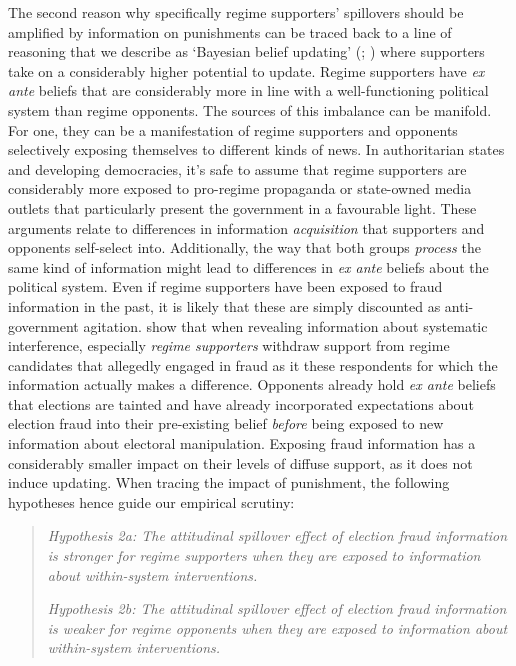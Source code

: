 \documentclass[11pt, ngerman,english,a4]{article}
\begin{document}
The second reason why specifically regime supporters' spillovers should be amplified by information on punishments can be traced back to a line of reasoning that we describe as `Bayesian belief updating' (\citealt{Bullock2009}; \citealt{Hill2017}) where supporters take on a considerably higher potential to update. Regime supporters have \textit{ex ante} beliefs that are considerably more in line with a well-functioning political system than regime opponents. The sources of this imbalance can be manifold. For one, they can be a manifestation of regime supporters and opponents selectively exposing themselves to different kinds of news. In authoritarian states and developing democracies, it's safe to assume that regime supporters are considerably more exposed to pro-regime propaganda or state-owned media outlets that particularly present the government in a favourable light. These arguments relate to differences in information \textit{acquisition} that supporters and opponents self-select into. Additionally, the way that both groups \textit{process} the same kind of information might lead to differences in \textit{ex ante} beliefs about the political system. Even if regime supporters have been exposed to fraud information in the past, it is likely that these are simply discounted as anti-government agitation. \citet{Reuter2019} show that when revealing information about systematic interference, especially \textit{regime supporters} withdraw support from regime candidates that allegedly engaged in fraud as it these respondents for which the information actually makes a difference. Opponents already hold \textit{ex ante} beliefs that elections are tainted and have already incorporated expectations about election fraud into their pre-existing belief \textit{before} being exposed to new information about electoral manipulation. Exposing fraud information has a considerably smaller impact on their levels of diffuse support, as it does not induce updating. When tracing the impact of punishment, the following hypotheses hence guide our empirical scrutiny: 

\begin{quote}
\singlespace
\noindent \textit{Hypothesis 2a: The attitudinal spillover effect of election fraud information is stronger for regime supporters when they are exposed to information about within-system interventions.}

\noindent \textit{Hypothesis 2b: The attitudinal spillover effect of election fraud information is weaker for regime opponents when they are exposed to information about within-system interventions.}
\end{quote}
\end{document}
